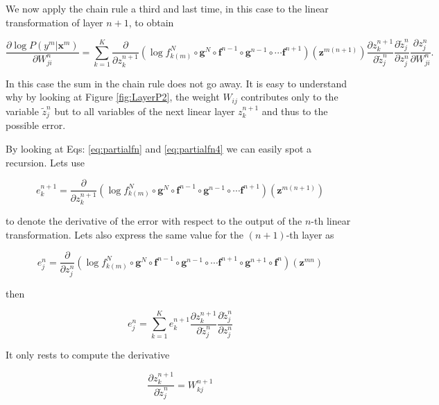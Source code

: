 We now apply the chain rule a third and last time, in this case to the linear transformation of layer $n+1$, to obtain

\begin{equation}
\frac{\partial \log P(y^m | \mathbf{x}^m)}{\partial W_{ji}^n} = \sum_{k=1}^K \frac{\partial}{\partial z^{n+1}_{k}} (\log f_{k(m)}^N \circ \mathbf{g}^N \circ \mathbf{f}^{n-1} \circ \mathbf{g}^{n-1} \circ \cdots \mathbf{f}^{n+1})(\mathbf{z}^{m(n+1)})\frac{\partial z^{n+1}_k}{\partial \tilde{z}_{j}^n}\frac{\partial \tilde{z}^n_{j}}{\partial z_{j}^n}\frac{\partial z^n_{j}}{\partial W_{ji}^n} .
\label{eq:partialfn4}
\end{equation}

In this case the sum in the chain rule does not go away. It is easy to understand why by looking at Figure \ref{fig:LayerP2}, the weight $W_{ij}$ contributes only to the variable $\tilde{z}^n_j$ but to all variables of the next linear layer $z^{n+1}_k$ and thus to the possible error. 

By looking at Eqs: \ref{eq:partialfn} and \ref{eq:partialfn4} we can easily spot a recursion. Lets use

\begin{equation}
e^{n+1}_k = \frac{\partial}{\partial z^{n+1}_{k}} (\log f_{k(m)}^N \circ \mathbf{g}^N \circ \mathbf{f}^{n-1} \circ \mathbf{g}^{n-1} \circ \cdots \mathbf{f}^{n+1})(\mathbf{z}^{m(n+1)})
\end{equation}

\noindent to denote the derivative of the error with respect to the output of the $n$-th linear transformation. Lets also express the same value for the $(n+1)$-th layer as   

\begin{equation}
e^{n}_j = \frac{\partial}{\partial z^{n}_{j}} (\log f_{k(m)}^N \circ \mathbf{g}^N \circ \mathbf{f}^{n-1} \circ \mathbf{g}^{n-1} \circ \cdots \mathbf{f}^{n+1} \circ \mathbf{g}^{n+1} \circ \mathbf{f}^{n})(\mathbf{z}^{mn}) 
\end{equation}

\noindent then

\begin{equation}
e^{n}_j = \sum_{k=1}^K e^{n+1}_k \frac{\partial z^{n+1}_k}{\partial \tilde{z}_{j}^n}\frac{\partial \tilde{z}^n_{j}}{\partial z_{j}^n} 
\end{equation}

\noindent It only rests to compute the derivative

\begin{equation}
\frac{\partial z^{n+1}_k}{\partial \tilde{z}_{j}^n} = W_{kj}^{n+1} 
\end{equation}

